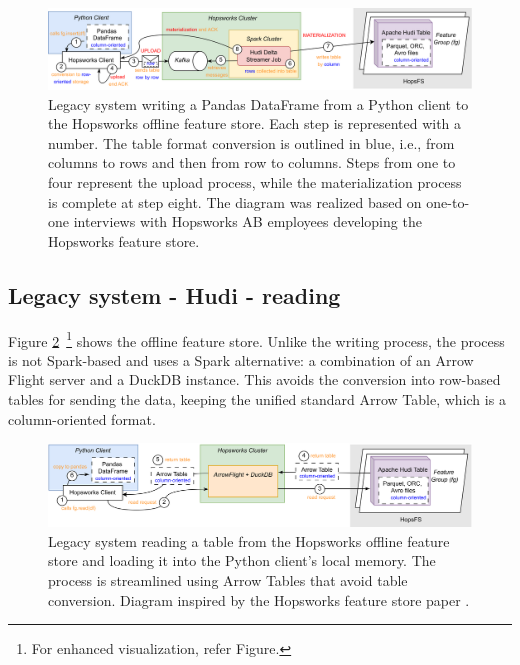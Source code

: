 \begin{figure}
    \begin{center}
      \includegraphics[width=\textwidth]{figures/2-background_and_related_work/hudi_write.png}
    \end{center}
    \caption[Legacy system - Hudi - write process]{Legacy system writing a Pandas DataFrame from a Python client to the Hopsworks offline feature store. Each step is represented with a number. The table format conversion is outlined in blue, i.e., from columns to rows and then from row to columns. Steps from one to four represent the upload process, while the materialization process is complete at step eight. The diagram was realized based on one-to-one interviews with Hopsworks \gls{AB} employees developing the Hopsworks feature store.}
    \label{fig:hudi_write}
\end{figure}



\subsection{Legacy system - Hudi - reading}
\label{subsec:back_sys_hudi_read}

Figure \ref{fig:hudi_read}~\footnote{For enhanced visualization, refer Figure.}  shows the offline feature store. Unlike the writing process, the process is not Spark-based and uses a Spark alternative: a combination of an Arrow Flight server and a DuckDB instance. This avoids the conversion into row-based tables for sending the data, keeping the unified standard Arrow Table, which is a column-oriented format.

\begin{figure}
    \begin{center}
      \includegraphics[width=\textwidth]{figures/2-background_and_related_work/hudi_read.png}
    \end{center}
    \caption[Legacy system - read process]{Legacy system reading a table from the Hopsworks offline feature store and loading it into the Python client's local memory. The process is streamlined using Arrow Tables that avoid table conversion. Diagram inspired by the Hopsworks feature store paper \cite{10.1145/3626246.3653389}.}
    \label{fig:hudi_read}
\end{figure}



